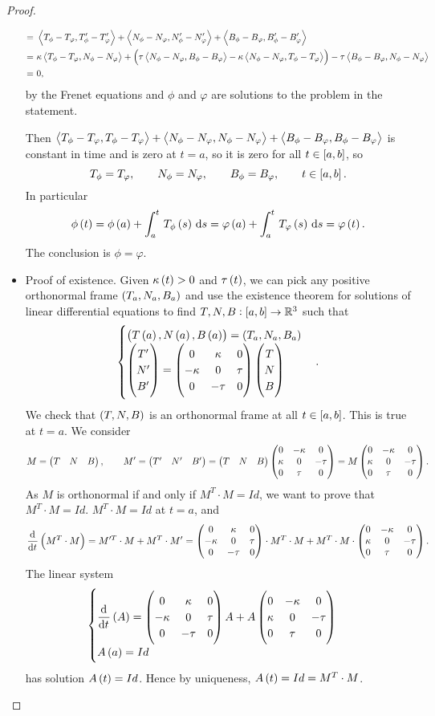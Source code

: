 \begin{proof}
\begin{itemize}
\begin{align*}
= \ & \abr{T_\phi - T_\varphi, T_\phi' - T_\varphi'} + \abr{N_\phi - N_\varphi, N_\phi' - N_\varphi'} + \abr{B_\phi - B_\varphi, B_\phi' - B_\varphi'} \\
= \ & \kappa\abr{T_\phi - T_\varphi, N_\phi - N_\varphi} + \br{\tau\abr{N_\phi - N_\varphi, B_\phi - B_\varphi} - \kappa\abr{N_\phi - N_\varphi, T_\phi - T_\varphi}} - \tau\abr{B_\phi - B_\varphi, N_\phi - N_\varphi} \\
= \ & 0,
\end{align*}
by the Frenet equations and $ \phi $ and $ \varphi $ are solutions to the problem in the statement.

\pagebreak

Then $ \left\langle T_\phi - T_\varphi, T_\phi - T_\varphi \right\rangle + \left\langle N_\phi - N_\varphi, N_\phi - N_\varphi \right\rangle + \left\langle B_\phi - B_\varphi, B_\phi - B_\varphi \right\rangle $ is constant in time and is zero at $ t = a $, so it is zero for all $ t \in \sbr{a, b} $, so
$$ T_\phi = T_\varphi, \qquad N_\phi = N_\varphi, \qquad B_\phi = B_\varphi, \qquad t \in \sbr{a, b}. $$
In particular
$$ \phi\br{t} = \phi\br{a} + \intd{a}{t}{T_\phi\br{s}}{s} = \varphi\br{a} + \intd{a}{t}{T_\varphi\br{s}}{s} = \varphi\br{t}. $$
The conclusion is $ \phi = \varphi $.
\item Proof of existence. Given $ \kappa\br{t} > 0 $ and $ \tau\br{t} $, we can pick any positive orthonormal frame $ \br{T_a, N_a, B_a} $ and use the existence theorem for solutions of linear differential equations to find $ T, N, B : \sbr{a, b} \to \R^3 $ such that
$$
\begin{cases}
\br{T\br{a}, N\br{a}, B\br{a}} = \br{T_a, N_a, B_a} \\
\threebyone{T'}{N'}{B'} = \threebythree{0}{\kappa}{0}{-\kappa}{0}{\tau}{0}{-\tau}{0}\threebyone{T}{N}{B}
\end{cases}.
$$
We check that $ \br{T, N, B} $ is an orthonormal frame at all $ t \in \sbr{a, b} $. This is true at $ t = a $. We consider
$$ M = \begin{pmatrix} T & N & B \end{pmatrix}, \qquad M' = \begin{pmatrix} T' & N' & B' \end{pmatrix} = \begin{pmatrix} T & N & B \end{pmatrix}\begin{pmatrix} 0 & -\kappa & 0 \\ \kappa & 0 & -\tau \\ 0 & \tau & 0 \end{pmatrix} = M\begin{pmatrix} 0 & -\kappa & 0 \\ \kappa & 0 & -\tau \\ 0 & \tau & 0 \end{pmatrix}. $$
As $ M $ is orthonormal if and only if $ M^T \cdot M = Id $, we want to prove that $ M^T \cdot M = Id $. $ M^T \cdot M = Id $ at $ t = a $, and
$$ \dod{}{t}\br{M^T \cdot M} = M'^T \cdot M + M^T \cdot M' = \threebythree{0}{\kappa}{0}{-\kappa}{0}{\tau}{0}{-\tau}{0} \cdot M^T \cdot M + M^T \cdot M \cdot \threebythree{0}{-\kappa}{0}{\kappa}{0}{-\tau}{0}{\tau}{0}. $$
The linear system
$$
\begin{cases}
\dod{}{t}\br{A} = \threebythree{0}{\kappa}{0}{-\kappa}{0}{\tau}{0}{-\tau}{0}A + A\threebythree{0}{-\kappa}{0}{\kappa}{0}{-\tau}{0}{\tau}{0} \\
A\br{a} = Id
\end{cases}
$$
has solution $ A\br{t} = Id $. Hence by uniqueness, $ A\br{t} = Id = M^T \cdot M $.
\end{itemize}
\end{proof}

